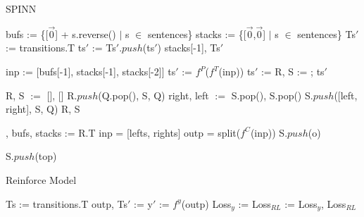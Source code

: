 \documentclass[11pt,a4paper]{article}
\begin{document}
\begin{algorithm}[H]
\caption{SPINN}\label{spinn}
\begin{algorithmic}[1]

\State bufs := \{[$\vec{0}$] + s.reverse() $\vert$ s $\in$ sentences\}
\State stacks := \{[$\vec{0}$,$\vec{0}$] $\vert$ s $\in$ sentences\}
\State Ts$'$ := transitions.T
 \State ts$'$ := 
 \State Ts$'.push$(ts$'$)
 \EndFor
 \State \Return stacks[-1], Ts$'$
 \EndFunction

\State inp := [bufs[-1], stacks[-1], stacks[-2]]
\State ts$'$ := $f^P$($f^T$(inp))
\State ts$'$ := 
\State R, S := 
\State {}; 
\State \Return ts$'$
\EndFunction

\State R, S $:= $ [], []
\State R$.push$(Q.pop(), S, Q)
\State right, left $:=$ S.pop(), S.pop()
\State S.$push$([left, right], S, Q)
\EndIf
\EndFor
\State \Return R, S
\EndFunction

, bufs, stacks := R.T
\State inp = [lefts, rights]
\State outp = split($f^C$(inp))
\State S$.push$(o)
\EndFor
\EndFunction

\State S$.push$(top)
\EndFor
\EndFunction

\end{algorithmic}
\end{algorithm}


\begin{algorithm}[H]
\caption{Reinforce Model}\label{rlloss}
\begin{algorithmic}[1]

\State Ts := transitions.T
\State outp, Ts$'$ := 
\State y$'$ := $f^y$(outp)
\State Loss$_y$ := 
\State Loss$_{RL}$ := 
\State \Return Loss$_y$, Loss$_{RL}$
\EndFunction

\end{algorithmic}
\end{algorithm}
\end{document}
